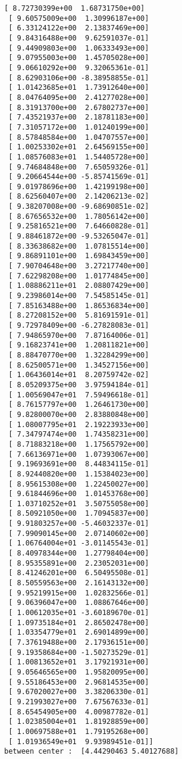 \documentclass[11pt]{article}
\begin{document}
\begin{Verbatim}[commandchars=\\\{\}]
 [ 8.72730399e+00  1.68731750e+00]
 [ 9.60575009e+00  1.30996187e+00]
 [ 6.33124122e+00  2.13837469e+00]
 [ 9.84316488e+00  9.62591037e-01]
 [ 9.44909803e+00  1.06333493e+00]
 [ 9.07955003e+00  1.45705028e+00]
 [ 9.06610292e+00  9.32065361e-01]
 [ 8.62903106e+00 -8.38958855e-01]
 [ 1.01423685e+01  1.73912640e+00]
 [ 8.04764095e+00  2.41277028e+00]
 [ 8.31913700e+00  2.67802737e+00]
 [ 7.43521937e+00  2.18781183e+00]
 [ 7.31057172e+00  1.01240199e+00]
 [ 8.57848584e+00  1.04707557e+00]
 [ 1.00253302e+01  2.64569155e+00]
 [ 1.08576083e+01  1.54405728e+00]
 [ 9.74684848e+00  7.65059326e-01]
 [ 9.20664544e+00 -5.85741569e-01]
 [ 9.01978696e+00  1.42199198e+00]
 [ 8.62560407e+00  2.14206213e-02]
 [ 9.38207008e+00 -9.68690851e-02]
 [ 8.67656532e+00  1.78056142e+00]
 [ 9.25816521e+00  7.64660828e-01]
 [ 9.88461872e+00 -9.53265047e-01]
 [ 8.33638682e+00  1.07815514e+00]
 [ 9.86891101e+00  1.69843459e+00]
 [ 7.90704648e+00  3.27217740e+00]
 [ 7.62298208e+00  1.01774845e+00]
 [ 1.08886211e+01  2.08807429e+00]
 [ 9.23986014e+00  7.54585145e-01]
 [ 7.85163488e+00  1.86536834e+00]
 [ 8.27208152e+00  5.81691591e-01]
 [ 9.72978409e+00 -6.27828083e-01]
 [ 7.94865970e+00  7.87164006e-01]
 [ 9.16823741e+00  1.20811821e+00]
 [ 8.88470770e+00  1.32284299e+00]
 [ 8.62500571e+00  1.34527156e+00]
 [ 1.06436014e+01  8.20759742e-02]
 [ 8.05209375e+00  3.97594184e-01]
 [ 1.00569047e+01  7.59496618e-01]
 [ 8.76157797e+00  1.26461730e+00]
 [ 9.82800070e+00  2.83880848e+00]
 [ 1.08007795e+01  2.19223933e+00]
 [ 7.34797474e+00  1.74358231e+00]
 [ 8.71883218e+00  1.17565792e+00]
 [ 7.66136971e+00  1.07393067e+00]
 [ 9.19693691e+00  8.44834115e-01]
 [ 8.92440820e+00  1.15384023e+00]
 [ 8.95615308e+00  1.22450027e+00]
 [ 9.61844696e+00  1.01453768e+00]
 [ 1.03710252e+01  3.50755058e+00]
 [ 8.50921050e+00  1.70945837e+00]
 [ 9.91803257e+00 -5.46032337e-01]
 [ 7.99090145e+00  2.07140602e+00]
 [ 1.06764004e+01 -3.01145543e-01]
 [ 8.40978344e+00  1.27798404e+00]
 [ 8.95355891e+00  2.23052031e+00]
 [ 8.41246201e+00  6.50495508e-01]
 [ 8.50559563e+00  2.16143132e+00]
 [ 9.95219915e+00  1.02832566e-01]
 [ 9.06396047e+00  1.08867646e+00]
 [ 1.00612035e+01 -3.60189670e-01]
 [ 1.09735184e+01  2.86502478e+00]
 [ 1.03354779e+01  2.69014899e+00]
 [ 7.37619488e+00  2.17936151e+00]
 [ 9.19358684e+00 -1.50273529e-01]
 [ 1.00813652e+01  3.17921931e+00]
 [ 9.05646565e+00  1.95820095e+00]
 [ 9.55186453e+00  2.96814535e+00]
 [ 9.67020027e+00  3.38206330e-01]
 [ 9.21993027e+00  7.67567633e-01]
 [ 8.65454905e+00  4.00987782e-01]
 [ 1.02385004e+01  1.81928859e+00]
 [ 1.00697588e+01  1.79195268e+00]
 [ 1.01936549e+01  9.93989451e-01]] 
between center :  [4.44290463 5.40127688] 


\end{Verbatim}
\end{document}
